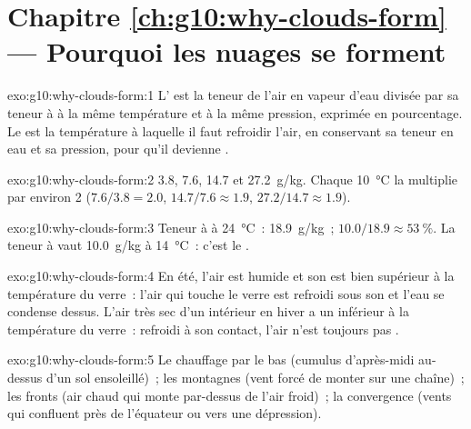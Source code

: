 \section*{Chapitre \ref{ch:g10:why-clouds-form} --- Pourquoi les nuages se forment}

\begin{solution}{exo:g10:why-clouds-form:1}
L' est la teneur de l'air en vapeur d'eau divisée par sa
teneur à  à la même température et à la même pression, exprimée
en pourcentage. Le  est la température à laquelle il faut
refroidir l'air, en conservant sa teneur en eau et sa pression, pour qu'il
devienne .
\end{solution}

\begin{solution}{exo:g10:why-clouds-form:2}
\num{3.8}, \num{7.6}, \num{14.7} et \qty{27.2}{g/kg}. Chaque
\qty{10}{\degreeCelsius} la multiplie par environ 2 ($7.6/3.8 = 2.0$,
$14.7/7.6 \approx 1.9$, $27.2/14.7 \approx 1.9$).
\end{solution}

\begin{solution}{exo:g10:why-clouds-form:3}
Teneur à  à \qty{24}{\degreeCelsius}~: \qty{18.9}{g/kg}~;
 $10.0/18.9 \approx \qty{53}{\percent}$. La teneur à
 vaut \qty{10.0}{g/kg} à \qty{14}{\degreeCelsius}~: c'est le .
\end{solution}

\begin{solution}{exo:g10:why-clouds-form:4}
En été, l'air est humide et son  est bien supérieur à la
température du verre~: l'air qui touche le verre est refroidi sous son  et l'eau se condense dessus. L'air très sec d'un intérieur en hiver
a un  inférieur à la température du verre~: refroidi à son
contact, l'air n'est toujours pas .
\end{solution}

\begin{solution}{exo:g10:why-clouds-form:5}
Le chauffage par le bas (cumulus d'après-midi au-dessus d'un sol ensoleillé)~;
les montagnes (vent forcé de monter sur une chaîne)~; les fronts (air chaud
qui monte par-dessus de l'air froid)~; la convergence (vents qui confluent
près de l'équateur ou vers une dépression).
\end{solution}

